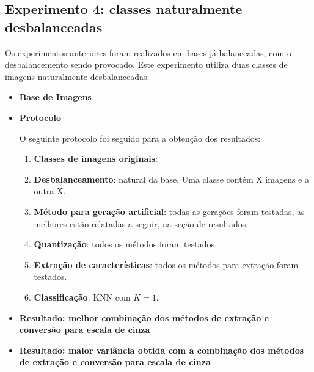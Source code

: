 \FloatBarrier
\subsection{Experimento 4: classes naturalmente desbalanceadas}

Os experimentos anteriores foram realizados em bases já balanceadas, com o desbalancemento sendo provocado. Este experimento utiliza duas classes de imagens naturalmente desbalanceadas.

\begin{itemize}
\item[] \textbf{Base de Imagens}


\item[] \textbf{Protocolo}

O seguinte protocolo foi seguido para a obtenção dos resultados:

\begin{enumerate}
\item \textbf{Classes de imagens originais}:
\item \textbf{Desbalanceamento}: natural da base. Uma classe contém X imagens e a outra X.
\item \textbf{Método para geração artificial}: todas as gerações foram testadas, as melhores estão relatadas a seguir, na seção de resultados.
\item \textbf{Quantização}: todos os métodos foram testados.
\item \textbf{Extração de características}: todos os métodos para extração foram testados.
\item \textbf{Classificação}: KNN com $K=1$.
\end{enumerate}

\item[] \textbf{Resultado: melhor combinação dos métodos de extração e conversão para escala de cinza}

\item[] \textbf{Resultado: maior variância obtida com a combinação dos métodos de extração e conversão para escala de cinza}


\end{itemize}
